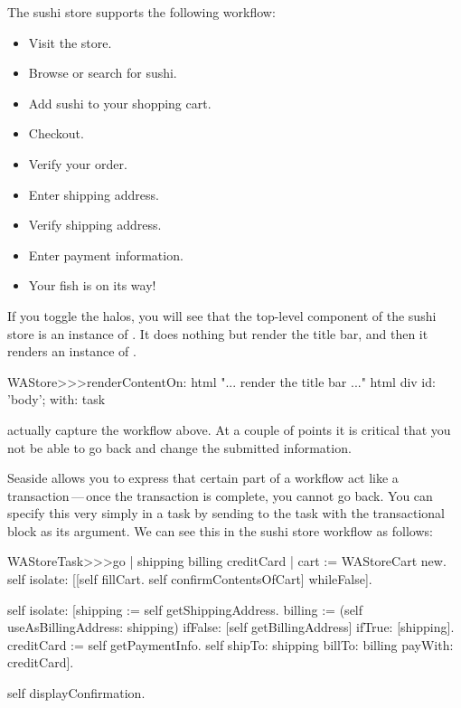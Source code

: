 \documentclass[a4paper,10pt,twoside]{book}
\begin{document}
The sushi store supports the following workflow:
\begin{itemize}
  \item Visit the store.
  \item Browse or search for sushi.
  \item Add sushi to your shopping cart.
  \item Checkout.
  \item Verify your order.
  \item Enter shipping address.
  \item Verify shipping address.
  \item Enter payment information.
  \item Your fish is on its way!
\end{itemize}

If you toggle the halos, you will see that the top-level component of the sushi store is an instance of .
It does nothing but render the title bar, and then it renders an instance of .

\begin{code}{}
WAStore>>>renderContentOn: html
	"... render the title bar ..."
	html div id: 'body'; with: task
\end{code}

 actually capture the workflow above.
At a couple of points it is critical that you not be able to go back and change the submitted information.


Seaside allows you to express that certain part of a workflow act like a transaction\,---\,once the transaction is complete, you cannot go back.
You can specify this very simply in a task by sending  to the task with the transactional block as its argument.
We can see this in the sushi store workflow as follows:

\begin{code}{}
WAStoreTask>>>go
	| shipping billing creditCard |
	cart := WAStoreCart new.
	self isolate:
		[[self fillCart.
		self confirmContentsOfCart]
			whileFalse].

	self isolate:
		[shipping := self getShippingAddress.
		billing := (self useAsBillingAddress: shipping)
					ifFalse: [self getBillingAddress]
					ifTrue: [shipping].
		creditCard := self getPaymentInfo.
		self shipTo: shipping billTo: billing payWith: creditCard].

	self displayConfirmation.
\end{code}
\end{document}
